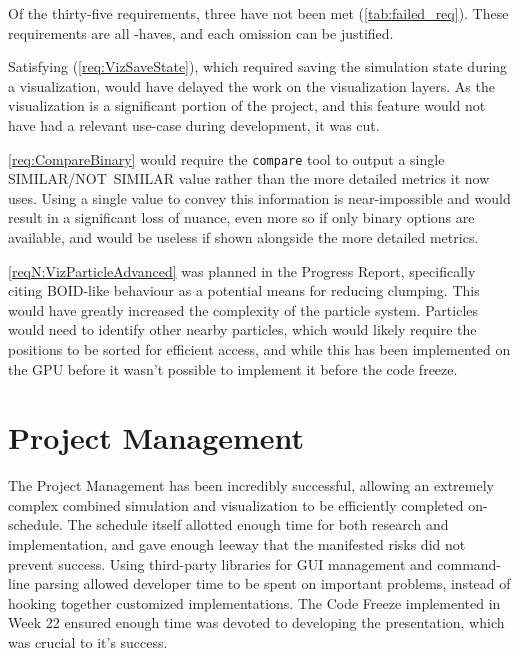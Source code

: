 Of the thirty-five requirements, three have not been met (\cref{tab:failed_req}).
These requirements are all \should{}-haves, and each omission can be justified.

Satisfying (\cref{req:VizSaveState}), which required saving the simulation state during a visualization, would have delayed the work on the visualization layers.
As the visualization is a significant portion of the project, and this feature would not have had a relevant use-case during development, it was cut.

\cref{req:CompareBinary} would require the \texttt{compare} tool to output a single SIMILAR/NOT~SIMILAR value rather than the more detailed metrics it now uses.
Using a single value to convey this information is near-impossible and would result in a significant loss of nuance, even more so if only binary options are available, and would be useless if shown alongside the more detailed metrics.

\cref{reqN:VizParticleAdvanced} was planned in the Progress Report, specifically citing BOID-like behaviour\cite{BOIDS_10.1145/37401.37406} as a potential means for reducing clumping.
This would have greatly increased the complexity of the particle system.
Particles would need to identify other nearby particles, which would likely require the positions to be sorted for efficient access, and while this has been implemented on the GPU before it wasn't possible to implement it before the code freeze.

\section{Project Management}
The Project Management has been incredibly successful, allowing an extremely complex combined simulation and visualization to be efficiently completed on-schedule.
The schedule itself allotted enough time for both research and implementation, and gave enough leeway that the manifested risks did not prevent success.
Using third-party libraries for GUI management and command-line parsing allowed developer time to be spent on important problems, instead of hooking together customized implementations.
The Code Freeze implemented in Week 22 ensured enough time was devoted to developing the presentation, which was crucial to it's success.

